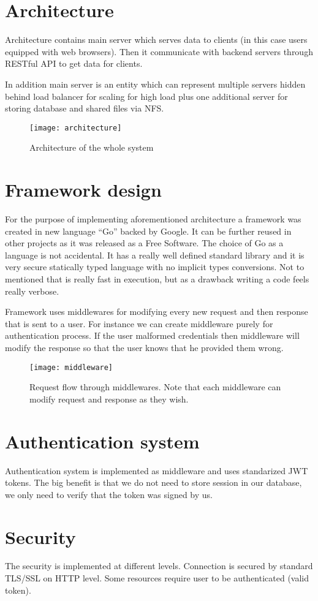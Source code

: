 \section{Architecture}
Architecture contains main server which serves data to clients (in this case users equipped with web browsers). Then it communicate with backend servers through RESTful API to get data for clients.

In addition main server is an entity which can represent multiple servers hidden behind load balancer for scaling for high load plus one additional server for storing database and shared files via NFS\@.

\begin{figure}[!htbp]
\centering
\texttt{[image: architecture]}
\label{fig:architecture}
\caption{Architecture of the whole system}
\end{figure}

\section{Framework design}
For the purpose of implementing aforementioned architecture a framework was created in new language ``Go'' backed by Google\cite{Go-wiki}. It can be further reused in other projects as it was released as a Free Software. The choice of Go as a language is not accidental. It has a really well defined standard library and it is very secure statically typed language with no implicit types conversions. Not to mentioned that is really fast in execution, but as a drawback writing a code feels really verbose.

Framework uses middlewares for modifying every new request and then response that is sent to a user. For instance we can create middleware purely for authentication process. If the user malformed credentials then middleware will modify the response so that the user knows that he provided them wrong.

\begin{figure}[!htbp]
\centering
\texttt{[image: middleware]}
\caption[Request flow through middlewares]{Request flow through middlewares. Note that each middleware can modify request and response as they wish.}
\label{fig:middleware}
\end{figure}

\section{Authentication system}
Authentication system is implemented as middleware and uses standarized JWT tokens\cite{JWT-rfc}. The big benefit is that we do not need to store session in our database, we only need to verify that the token was signed by us.

\section{Security}
The security is implemented at different levels. Connection is secured by standard TLS/SSL on HTTP level. Some resources require user to be authenticated (valid token).
